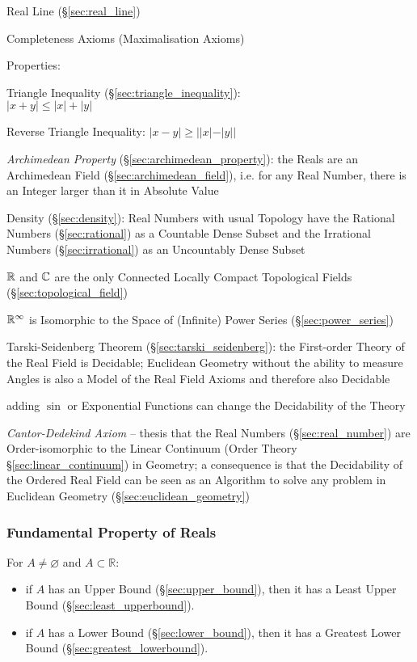 Real Line (\S\ref{sec:real_line})

Completeness Axioms (Maximalisation Axioms)

Properties:

Triangle Inequality (\S\ref{sec:triangle_inequality}):\\
$|x + y| \leq |x| + |y|$

Reverse Triangle Inequality: $|x - y| \geq ||x| - |y||$

\emph{Archimedean Property} (\S\ref{sec:archimedean_property}): the Reals are
an Archimedean Field (\S\ref{sec:archimedean_field}), i.e. for any Real Number,
there is an Integer larger than it in Absolute Value

Density (\S\ref{sec:density}): Real Numbers with usual Topology have the
Rational Numbers (\S\ref{sec:rational}) as a Countable Dense Subset and the
Irrational Numbers (\S\ref{sec:irrational}) as an Uncountably Dense Subset

$\mathbb{R}$ and $\mathbb{C}$ are the only Connected Locally Compact
Topological Fields (\S\ref{sec:topological_field})

$\mathbb{R}^\infty$ is Isomorphic to the Space of (Infinite) Power Series
(\S\ref{sec:power_series})

Tarski-Seidenberg Theorem (\S\ref{sec:tarski_seidenberg}): the First-order
Theory of the Real Field is Decidable; Euclidean Geometry without the ability
to measure Angles is also a Model of the Real Field Axioms and therefore also
Decidable

adding $\sin$ or Exponential Functions can change the Decidability of the Theory

\emph{Cantor-Dedekind Axiom} -- thesis that the Real Numbers
(\S\ref{sec:real_number}) are Order-isomorphic to the Linear Continuum (Order
Theory \S\ref{sec:linear_continuum}) in Geometry; a consequence is that the
Decidability of the Ordered Real Field can be seen as an Algorithm to solve any
problem in Euclidean Geometry (\S\ref{sec:euclidean_geometry})



\subsubsection{Fundamental Property of Reals}
\label{sec:fundamental_property}

For $A \neq \varnothing$ and $A \subset \mathbb{R}$:
\begin{itemize}
  \item if $A$ has an Upper Bound (\S\ref{sec:upper_bound}), then it
    has a Least Upper Bound (\S\ref{sec:least_upperbound}).
  \item if $A$ has a Lower Bound (\S\ref{sec:lower_bound}), then it
    has a Greatest Lower Bound (\S\ref{sec:greatest_lowerbound}).
\end{itemize}

